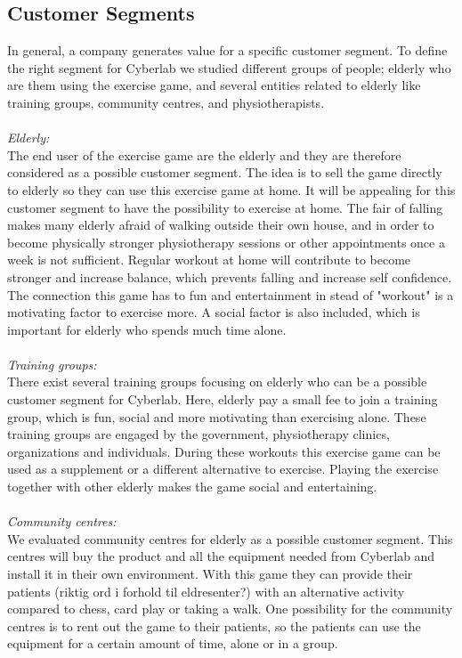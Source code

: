 \subsection{Customer Segments}
In general, a company generates value for a specific customer segment. To define the right segment for Cyberlab we studied different groups of people; elderly who are them using the exercise game, and several entities related to elderly like training groups, community centres, and physiotherapists.\\ \\ 
\emph{Elderly:}\\ 
The end user of the exercise game are the elderly and they are therefore considered as a possible customer segment. The idea is to sell the game directly to elderly so they can use this exercise game at home. It will be  appealing for this customer segment to have the possibility to exercise at home. The fair of falling makes many elderly afraid of walking outside their own house, and in order to become physically stronger physiotherapy sessions or other appointments once a week is not sufficient. Regular workout at home will contribute to become stronger and increase balance, which prevents falling and increase self confidence. The connection this game has to fun and entertainment in stead of "workout" is a motivating factor to exercise more. A social factor is also included, which is important for elderly who spends much time alone. \\ \\
\emph{Training groups:}\\ 
There exist several training groups focusing on elderly who can be a possible customer segment for Cyberlab. Here, elderly pay a small fee to join a training group, which is fun, social and more motivating than exercising alone. These training groups are engaged by the government, physiotherapy clinics, organizations and individuals. During these workouts this exercise game can be used as a supplement or a different alternative to exercise. Playing the exercise together with other elderly makes the game social and entertaining. \\ \\
\emph{Community centres:} \\
We evaluated community centres for elderly as a possible customer segment. This centres will buy the product and all the equipment needed from Cyberlab and install it in their own environment. With this game they can provide their patients (riktig ord i forhold til eldresenter?) with an alternative activity compared to chess, card play or taking a walk. One possibility for the community centres is to rent out the game to their patients, so the patients can use the equipment for a certain amount of time, alone or in a group. \\ \\
